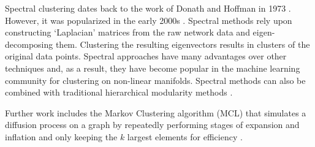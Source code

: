 \documentclass{article}
\begin{document}
Spectral clustering dates back to the work of Donath and Hoffman in 1973 \cite{donath1973lower}. 
However, it was popularized in the early 2000s \cite{ng2002spectral}. 
Spectral methods rely upon constructing `Laplacian' matrices from the raw network data and eigen-decomposing them. 
Clustering the resulting eigenvectors results in clusters of the original data points. 
Spectral approaches have many advantages over other techniques and, as a result, they have become popular in the machine learning community for clustering  on non-linear manifolds. 
Spectral methods can also be combined with traditional hierarchical modularity methods \cite{donetti2004detecting}.




Further work includes the Markov Clustering algorithm (MCL) that simulates a diffusion process on a graph by repeatedly performing stages of expansion and inflation and only keeping the $k$ largest elements for efficiency \cite{van2001graph}. 
\end{document}
